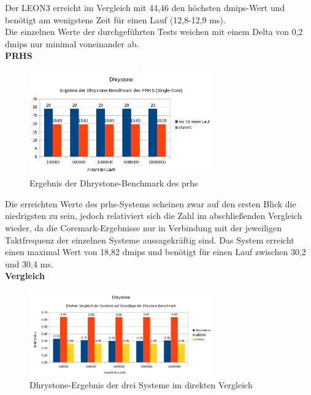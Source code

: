 Der LEON3 erreicht im Vergleich mit 44,46 den höchsten \ac{dmips}-Wert und benötigt am wenigstens Zeit für einen Lauf (12,8-12,9 ms).\\ Die einzelnen Werte der durchgeführten Tests weichen mit
einem Delta von 0,2 \ac{dmips} nur minimal voneinander ab.\\

\textbf{PRHS}

\begin{figure}[H]
\centering
\includegraphics[width=0.7\textwidth]{Hauptteil/dhrystonesingleprhs.png}
\caption{Ergebnis der Dhrystone-Benchmark des \ac{prhs}}
\label{fig:dhrystonesingleprhs}
\end{figure}

Die erreichten Werte des \ac{prhs}-Systems scheinen zwar auf den ersten Blick die niedrigsten zu sein, jedoch relativiert sich die Zahl im abschließenden Vergleich wieder, da die
Coremark-Ergebnisse nur in Verbindung mit der jeweiligen Taktfrequenz der einzelnen Systeme aussagekräftig sind. Das System erreicht einen maximal Wert von
18,82 \ac{dmips} und benötigt für einen Lauf zwischen 30,2 und 30,4 ms.\\

\textbf{Vergleich}


\begin{figure}[H]
\centering
\includegraphics[width=0.7\textwidth]{Hauptteil/dhrystoneresult.png}
\caption{Dhrystone-Ergebnis der drei Systeme im direkten Vergleich}
\label{fig:dhrystoneresult}
\end{figure}

